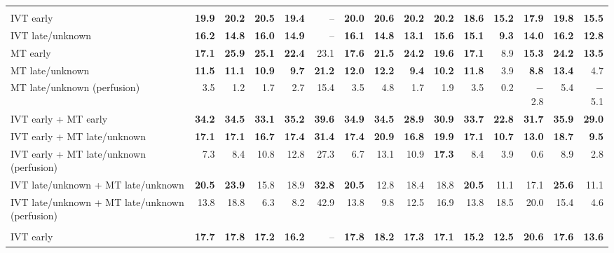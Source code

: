 \begin{landscape}
{\begin{longtable}{p{4.9cm}rrrrrrrrrrrrrr}
\addlinespace
\multicolumn{15}{l}{\textbf{NIHSS 11--15}}\\
IVT early & \textbf{19.9} & \textbf{20.2} & \textbf{20.5} & \textbf{19.4} & -- & \textbf{20.0} & \textbf{20.6} & \textbf{20.2} & \textbf{20.2} & \textbf{18.6} & \textbf{15.2} & \textbf{17.9} & \textbf{19.8} & \textbf{15.5} \\
IVT late/unknown & \textbf{16.2} & \textbf{14.8} & \textbf{16.0} & \textbf{14.9} & -- & \textbf{16.1} & \textbf{14.8} & \textbf{13.1} & \textbf{15.6} & \textbf{15.1} & \textbf{9.3} & \textbf{14.0} & \textbf{16.2} & \textbf{12.8} \\
MT early & \textbf{17.1} & \textbf{25.9} & \textbf{25.1} & \textbf{22.4} & 23.1 & \textbf{17.6} & \textbf{21.5} & \textbf{24.2} & \textbf{19.6} & \textbf{17.1} & 8.9 & \textbf{15.3} & \textbf{24.2} & \textbf{13.5} \\
MT late/unknown & \textbf{11.5} & \textbf{11.1} & \textbf{10.9} & \textbf{9.7} & \textbf{21.2} & \textbf{12.0} & \textbf{12.2} & \textbf{9.4} & \textbf{10.2} & \textbf{11.8} & 3.9 & \textbf{8.8} & \textbf{13.4} & 4.7 \\
MT late/unknown (perfusion) & 3.5 & 1.2 & 1.7 & 2.7 & 15.4 & 3.5 & 4.8 & 1.7 & 1.9 & 3.5 & 0.2 & $-$2.8 & 5.4 & $-$5.1 \\
IVT early + MT early & \textbf{34.2} & \textbf{34.5} & \textbf{33.1} & \textbf{35.2} & \textbf{39.6} & \textbf{34.9} & \textbf{34.5} & \textbf{28.9} & \textbf{30.9} & \textbf{33.7} & \textbf{22.8} & \textbf{31.7} & \textbf{35.9} & \textbf{29.0} \\
IVT early + MT late/unknown & \textbf{17.1} & \textbf{17.1} & \textbf{16.7} & \textbf{17.4} & \textbf{31.4} & \textbf{17.4} & \textbf{20.9} & \textbf{16.8} & \textbf{19.9} & \textbf{17.1} & \textbf{10.7} & \textbf{13.0} & \textbf{18.7} & \textbf{9.5} \\
IVT early + MT late/unknown (perfusion) & 7.3 & 8.4 & 10.8 & 12.8 & 27.3 & 6.7 & 13.1 & 10.9 & \textbf{17.3} & 8.4 & 3.9 & 0.6 & 8.9 & 2.8 \\
IVT late/unknown + MT late/unknown & \textbf{20.5} & \textbf{23.9} & 15.8 & 18.9 & \textbf{32.8} & \textbf{20.5} & 12.8 & 18.4 & 18.8 & \textbf{20.5} & 11.1 & 17.1 & \textbf{25.6} & 11.1 \\
IVT late/unknown + MT late/unknown (perfusion) & 13.8 & 18.8 & 6.3 & 8.2 & 42.9 & 13.8 & 9.8 & 12.5 & 16.9 & 13.8 & 18.5 & 20.0 & 15.4 & 4.6 \\
\addlinespace
\multicolumn{15}{l}{\textbf{NIHSS 16--20}}\\
IVT early & \textbf{17.7} & \textbf{17.8} & \textbf{17.2} & \textbf{16.2} & -- & \textbf{17.8} & \textbf{18.2} & \textbf{17.3} & \textbf{17.1} & \textbf{15.2} & \textbf{12.5} & \textbf{20.6} & \textbf{17.6} & \textbf{13.6} \\

\end{longtable}}
\end{landscape}
